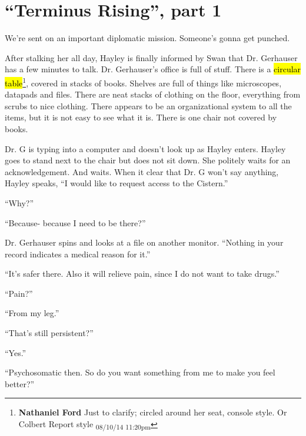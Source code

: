 \setcounter{chapter}{ 26 }
\chapter{\textbf{``Terminus Rising'', part 1} }






We're sent on an important diplomatic mission.  Someone's gonna get punched.








After stalking her all day, Hayley is finally informed by Swan that Dr. Gerhauser has a few minutes to talk.  Dr. Gerhauser's office is full of stuff. There is a \hl{circular table}\footnote{\textbf{Nathaniel Ford }Just to clarify; circled around her seat, console style. Or Colbert Report style \textsubscript{08/10/14 11:20pm}}, covered in stacks of books.  Shelves are full of things like microscopes, datapads and files.  There are neat stacks of clothing on the floor, everything from scrubs to nice clothing.  There appears to be an organizational system to all the items, but it is not easy to see what it is.  There is one chair not covered by books.



Dr. G is typing into a computer and doesn't look up as Hayley enters.  Hayley goes to stand next to the chair but does not sit down.  She politely waits for an acknowledgement.  And waits.  When it clear that Dr. G won't say anything, Hayley speaks, ``I would like to request access to the Cistern.''

``Why?''

``Because- because I need to be there?''

Dr. Gerhauser spins and looks at a file on another monitor.  ``Nothing in your record indicates a medical reason for it.''

``It's safer there.  Also it will relieve pain, since I do not want to take drugs.''

``Pain?''

``From my leg.''

``That's still persistent?''

``Yes.''

``Psychosomatic then.  So do you want something from me to make you feel better?''

